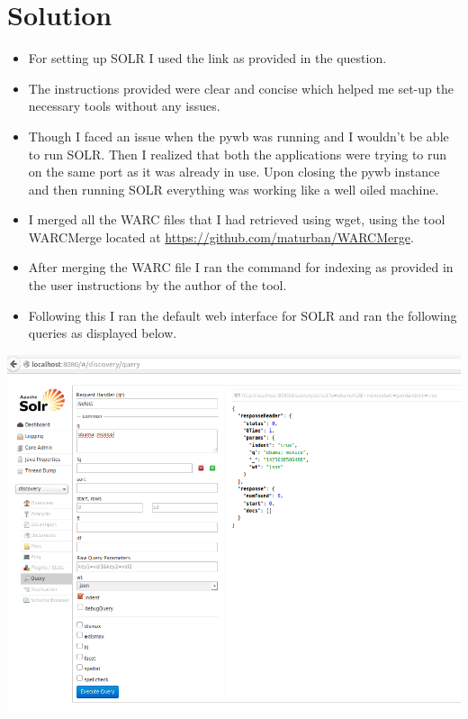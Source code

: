 \section{Solution}
\begin{itemize}
\item For setting up SOLR I used the link as provided in the question.
\item The instructions provided were clear and concise which helped me set-up the necessary tools without any issues.
\item Though I faced an issue when the pywb was running and I wouldn't be able to run SOLR. Then I realized that both the applications were trying to run on the same port as it was already in use. Upon closing the pywb instance and then running SOLR everything was working like a well oiled machine.
\item I merged all the WARC files that I had retrieved using wget, using the tool WARCMerge located at \hyperref[savePage]{https://github.com/maturban/WARCMerge}.
\item After merging the WARC file I ran the command for indexing as provided in the user instructions by the author of the tool.
\item Following this I ran the default web interface for SOLR and ran the following queries as displayed below.
\end{itemize}
\newpage
\begin{minipage}{\linewidth}
	\includegraphics[scale=0.55]{figures/query/query_obama_mexico.PNG}
	\label{query_obama_mexico}
\end{minipage}
